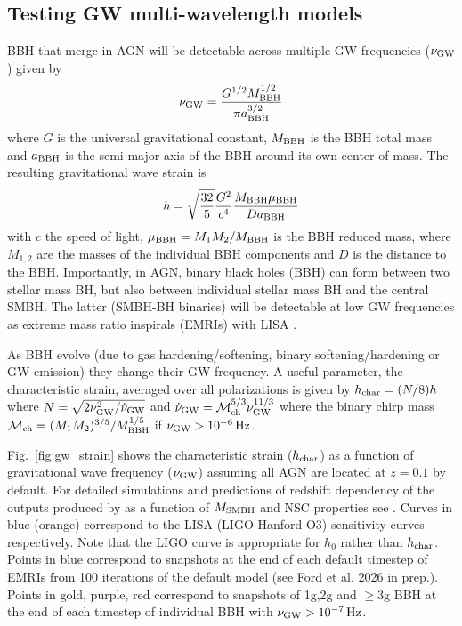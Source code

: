 \subsection{Testing GW multi-wavelength models}
\label{sec:gw}
BBH that merge in AGN will be detectable across multiple GW frequencies ($\nu_{\rm GW}$) given by
\begin{equation}
    \nu_{\rm GW} = \frac{G^{1/2}M_{\rm BBH}^{1/2}}{\pi a_{\rm BBH}^{3/2}}
\end{equation}
where $G$ is the universal gravitational constant, $M_{\rm BBH}$ is the BBH total mass and $a_{\rm BBH}$ is the semi-major axis of the BBH around its own center of mass. The resulting gravitational wave strain is
\begin{equation}
    h = \sqrt{\frac{32}{5}} \frac{G^{2}}{c^{4}}\frac{M_{\rm BBH}\mu_{\rm BBH}}{D a_{\rm BBH}}
\end{equation}
with $c$ the speed of light, $\mu_{\rm BBH}=M_{1}M_{2}/M_{\rm BBH}$ is the BBH reduced mass, where $M_{1,2}$ are the masses of the individual BBH components and $D$ is the distance to the BBH. Importantly, in AGN, binary black holes (BBH) can form between two stellar mass BH, but also between individual stellar mass BH and the central SMBH. The latter (SMBH-BH binaries) will be detectable at low GW frequencies as extreme mass ratio inspirals (EMRIs) with LISA \citep{LISA23}.

As BBH evolve (due to gas hardening/softening, binary softening/hardening or GW emission) they change their GW frequency. A useful parameter, the characteristic strain, averaged over all polarizations is
given by $h_{\rm char} = (N/8)h$ where $N = \sqrt{2\nu_{\rm GW}^{2}/\dot{\nu}_{\rm GW}}$ and $\dot{\nu}_{\rm GW}=\mathcal{M}_{\rm ch}^{5/3}\nu_{\rm GW}^{11/3}$ where the binary chirp mass $\mathcal{M}_{\rm ch}=(M_{1}M_{2})^{3/5}/M_{\rm BBH}^{1/5}$ if $\nu_{\rm GW}>10^{-6}\,{\rm Hz}$. 

Fig.~\ref{fig:gw_strain} shows the characteristic strain  ($h_{\rm char}$) as a function of gravitational wave frequency ($\nu_{\rm GW}$) assuming all AGN are located at $z=0.1$ by default. For detailed simulations and predictions of redshift dependency of the outputs produced by  as a function of $M_{\rm SMBH}$ and NSC properties see \citet{Delfavero+25-mcfactsIII}. Curves in blue (orange) correspond to the LISA (LIGO Hanford O3) sensitivity curves respectively. Note that the LIGO curve is appropriate for $h_{0}$ rather than $h_{\rm char}$. Points in blue correspond to snapshots at the end of each default timestep of EMRIs from 100 iterations of the default model (see Ford et al. 2026 in prep.). Points in gold, purple, red correspond to snapshots of 1g,2g and $\geq 3$g BBH at the end of each timestep of individual BBH with $\nu_{\rm GW}>10^{-7}\,{\rm Hz}$. 

